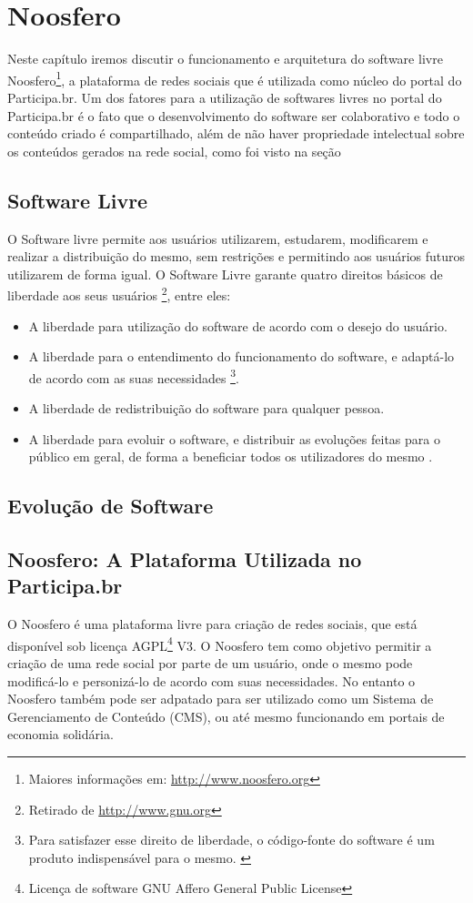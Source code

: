 \chapter{Noosfero}

Neste capítulo iremos discutir o funcionamento e arquitetura do software livre Noosfero\footnote{Maiores informações em: \url{http://www.noosfero.org}}, a plataforma de redes sociais que é utilizada como núcleo do portal do Participa.br. Um dos fatores para a utilização de softwares livres no portal do Participa.br é o fato que o desenvolvimento do software ser colaborativo e todo o conteúdo criado é compartilhado, além de não haver propriedade intelectual sobre os conteúdos gerados na rede social, como foi visto na seção %


\section{Software Livre}

O Software livre permite aos usuários utilizarem, estudarem, modificarem e realizar a distribuição do mesmo, sem restrições e permitindo aos usuários futuros utilizarem de forma igual. %
O Software Livre garante quatro direitos básicos de liberdade aos seus usuários \footnote{Retirado de \url{http://www.gnu.org}}, entre eles:

\begin{itemize}
\item A liberdade para utilização do software de acordo com o desejo do usuário.
\item A liberdade para o entendimento do funcionamento do software, e adaptá-lo de acordo com as suas necessidades \footnote{Para satisfazer esse direito de liberdade, o código-fonte do software é um produto indispensável para o mesmo. \label{ft:codfonte}}.
\item A liberdade de redistribuição do software para qualquer pessoa.
\item A liberdade para evoluir o software, e distribuir as evoluções feitas para o público em geral, de forma a beneficiar todos os utilizadores do mesmo .
\end{itemize}

\section{Evolução de Software}

\section{Noosfero: A Plataforma Utilizada no Participa.br}
O Noosfero é uma plataforma livre para criação de redes sociais, que está disponível sob licença AGPL\footnote{Licença de software GNU Affero General Public License} V3. O Noosfero tem como objetivo permitir a criação de uma rede social por parte de um usuário, onde o mesmo pode modificá-lo e personizá-lo de acordo com suas necessidades. No entanto o Noosfero também pode ser adpatado para ser utilizado como um Sistema de Gerenciamento de Conteúdo (CMS), ou até mesmo funcionando em portais de economia solidária.

